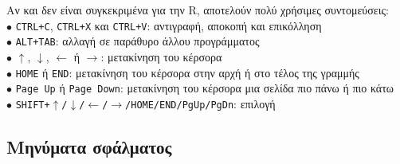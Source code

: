 \documentclass[a4paper,10pt,twocolumn]{article}
\begin{document}
\noindent Αν και δεν είναι συγκεκριμένα για την R, αποτελούν πολύ χρήσιμες συντομεύσεις:\\
$\bullet$ \texttt{CTRL+C}, \texttt{CTRL+X} και \texttt{CTRL+V}: αντιγραφή, αποκοπή και επικόλληση\\
$\bullet$ \texttt{ALT+TAB}: αλλαγή σε παράθυρο άλλου προγράμματος\\
$\bullet$ $\uparrow$, $\downarrow$, $\leftarrow$ ή $\rightarrow$: μετακίνηση του κέρσορα\\
$\bullet$ \texttt{HOME} ή \texttt{END}: μετακίνηση του κέρσορα στην αρχή ή στο τέλος της γραμμής\\
$\bullet$ \texttt{Page Up} ή \texttt{Page Down}: μετακίνηση του κέρσορα μια σελίδα πιο πάνω ή πιο κάτω\\
$\bullet$ \texttt{SHIFT+$\uparrow$/$\downarrow$/$\leftarrow$/$\rightarrow$/HOME/END/PgUp/PgDn}: επιλογή\\

\subsection{Μηνύματα σφάλματος}
\end{document}
